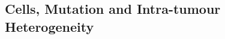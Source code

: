 \documentclass[../main.tex]{subfiles}
\begin{document}
\subsection{Cells, Mutation and Intra-tumour Heterogeneity}


 
\end{document}
